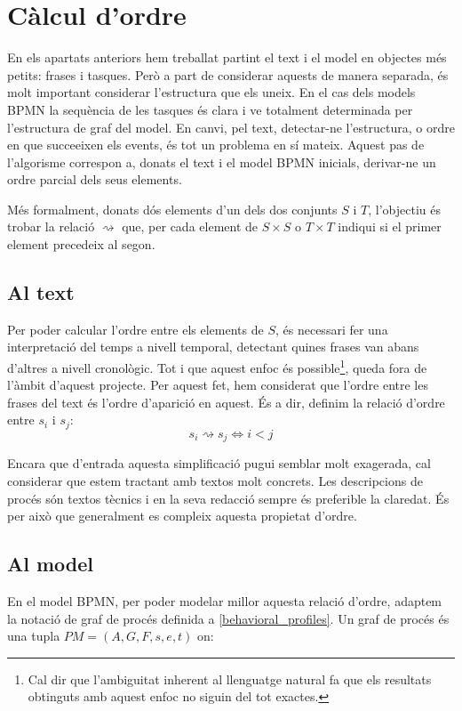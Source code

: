 \section{Càlcul d'ordre}
\label{sec:enfoc-ordre}
En els apartats anteriors hem treballat partint el text i el model en objectes més petits: frases i tasques. Però a part de considerar aquests de manera separada, és molt important considerar l'estructura que els uneix. En el cas dels models BPMN la sequència de les tasques és clara i ve totalment determinada per l'estructura de graf del model. En canvi, pel text, detectar-ne l'estructura, o ordre en que succeeixen els events, és tot un problema en sí mateix. Aquest pas de l'algorisme correspon a, donats el text i el model BPMN inicials, derivar-ne un ordre parcial dels seus elements.

Més formalment, donats dós elements d'un dels dos conjunts $S$ i $T$, l'objectiu és trobar la relació $\rightsquigarrow$ que, per cada element de $S \times S$ o $T \times T$ indiqui si el primer element precedeix al segon.

\subsection{Al text}
\label{sec:enfoc-ordre-text}

Per poder calcular l'ordre entre els elements de $S$, és necessari fer una interpretació del temps a nivell temporal, detectant quines frases van abans d'altres a nivell cronològic. Tot i que aquest enfoc és possible\footnote{Cal dir que l'ambiguitat inherent al llenguatge natural fa que els resultats obtinguts amb aquest enfoc no siguin del tot exactes.}, queda fora de l'àmbit d'aquest projecte. Per aquest fet, hem considerat que l'ordre entre les frases del text és l'ordre d'aparició en aquest. És a dir, definim la relació d'ordre entre $s_i$ i $s_j$: $$s_i \rightsquigarrow s_j \iff i < j$$

Encara que d'entrada aquesta simplificació pugui semblar molt exagerada, cal considerar que estem tractant amb textos molt concrets. Les descripcions de procés són textos tècnics i en la seva redacció sempre és preferible la claredat. És per això que generalment es compleix aquesta propietat d'ordre.

\subsection{Al model}
\label{sec:enfoc-ordre-model}

En el model BPMN, per poder modelar millor aquesta relació d'ordre, adaptem la notació de graf de procés definida a \ref{behavioral_profiles}. Un graf de procés és una tupla $PM = (A, G, F, s, e, t)$ on:

